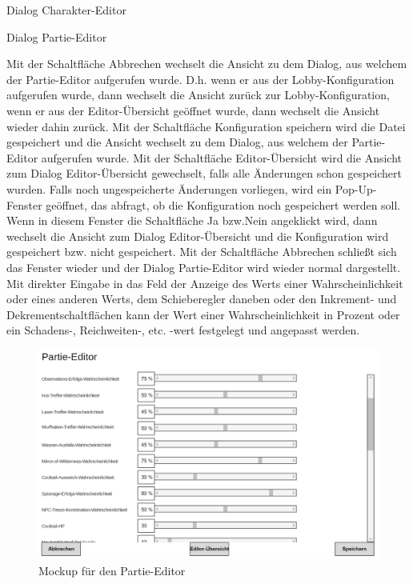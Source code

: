Dialog \glqq{}Charakter-Editor\grqq{}

Dialog \glqq{}Partie-Editor\grqq{}

Mit der Schaltfläche \glqq{}Abbrechen\grqq{} wechselt die Ansicht zu dem Dialog, aus welchem der Partie-Editor aufgerufen wurde. D.h. wenn er aus der Lobby-Konfiguration aufgerufen wurde, dann wechselt die Ansicht zurück zur Lobby-Konfiguration, wenn er aus der Editor-Übersicht geöffnet wurde, dann wechselt die Ansicht wieder dahin zurück.
Mit der Schaltfläche \glqq{}Konfiguration speichern\grqq{} wird die Datei gespeichert und die Ansicht wechselt zu dem Dialog,  aus welchem der Partie-Editor aufgerufen wurde.
Mit der Schaltfläche \glqq{}Editor-Übersicht\grqq{} wird die Ansicht zum Dialog \glqq{}Editor-Übersicht\grqq{} gewechselt, falls alle Änderungen schon gespeichert wurden. Falls noch ungespeicherte Änderungen vorliegen, wird ein Pop-Up-Fenster geöffnet, das abfragt, ob die Konfiguration noch gespeichert werden soll. Wenn in diesem Fenster die Schaltfläche \glqq{}Ja\grqq{} bzw.\glqq{}Nein\grqq{} angeklickt wird, dann wechselt die Ansicht zum Dialog \glqq{}Editor-Übersicht\grqq{} und die Konfiguration wird gespeichert bzw. nicht gespeichert. Mit der Schaltfläche \glqq{}Abbrechen\grqq{} schließt sich das Fenster wieder und der Dialog \glqq{}Partie-Editor\grqq{} wird wieder normal dargestellt.
Mit direkter Eingabe in das Feld der Anzeige des Werts einer Wahrscheinlichkeit oder eines anderen Werts, dem Schieberegler daneben oder den Inkrement- und Dekrementschaltflächen kann der Wert einer Wahrscheinlichkeit in Prozent oder ein Schadens-, Reichweiten-, etc. -wert festgelegt und angepasst werden.

\begin{figure}
  \centering
  \includegraphics[width=\textwidth]{Meilenstein03/Partie-Editor_Mockup.png}
  \caption{Mockup für den Partie-Editor}
\end{figure}

